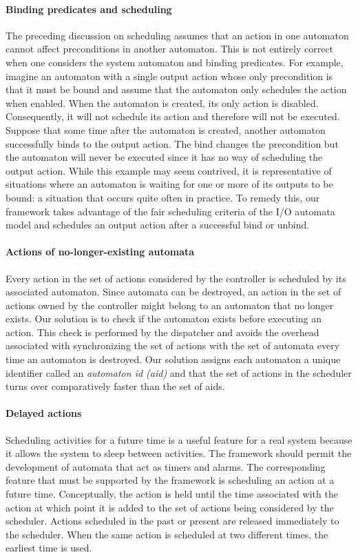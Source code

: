 \paragraph*{Binding predicates and scheduling}
The preceding discussion on scheduling assumes that an action in one automaton cannot affect preconditions in another automaton.
This is not entirely correct when one considers the system automaton and binding predicates.
For example, imagine an automaton with a single output action whose only precondition is that it must be bound and assume that the automaton only schedules the action when enabled.
When the automaton is created, its only action is disabled.
Consequently, it will not schedule its action and therefore will not be executed.
Suppose that some time after the automaton is created, another automaton successfully binds to the output action.
The bind changes the precondition but the automaton will never be executed since it has no way of scheduling the output action.
While this example may seem contrived, it is representative of situations where an automaton is waiting for one or more of its outputs to be bound: a situation that occurs quite often in practice.
To remedy this, our framework takes advantage of the fair scheduling criteria of the I/O automata model and schedules an output action after a successful bind or unbind.

\paragraph*{Actions of no-longer-existing automata}
Every action in the set of actions considered by the controller is scheduled by its associated automaton.
Since automata can be destroyed, an action in the set of actions owned by the controller might belong to an automaton that no longer exists.
Our solution is to check if the automaton exists before executing an action.
This check is performed by the dispatcher and avoids the overhead associated with synchronizing the set of actions with the set of automata every time an automaton is destroyed.
Our solution assigns each automaton a unique identifier called an \emph{automaton id (aid)} and that the set of actions in the scheduler turns over comparatively faster than the set of aids.

\paragraph*{Delayed actions}
Scheduling activities for a future time is a useful feature for a real system because it allows the system to sleep between activities.
The framework should permit the development of automata that act as timers and alarms.
The corresponding feature that must be supported by the framework is scheduling an action at a future time.
Conceptually, the action is held until the time associated with the action at which point it is added to the set of actions being considered by the scheduler.
Actions scheduled in the past or present are released immediately to the scheduler.
When the same action is scheduled at two different times, the earliest time is used.

